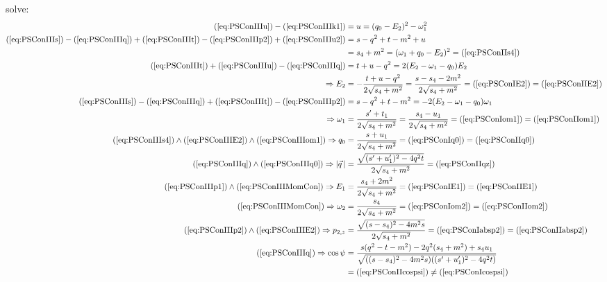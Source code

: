 solve:
\begin{align}
(\ref{eq:PSConIIIu})-(\ref{eq:PSConIIIk1}) &= u=(q_0-E_2)^2-\omega_1^2 \label{eq:PSConIIIu2}\\
(\ref{eq:PSConIIIs}) - (\ref{eq:PSConIIIq}) + (\ref{eq:PSConIIIt}) - (\ref{eq:PSConIIIp2}) + (\ref{eq:PSConIIIu2}) &= s-q^2+t-m^2+u\\
 &= s_4+m^2 = (\omega_1+q_0-E_2)^2 =(\ref{eq:PSConIIs4}) \label{eq:PSConIIIs4}\\
(\ref{eq:PSConIIIt}) + (\ref{eq:PSConIIIu}) - (\ref{eq:PSConIIIq}) &= t+u-q^2 = 2(E_2-\omega_1-q_0)E_2\\
\Rightarrow E_2 &= -\frac{t+u-q^2}{2\sqrt{s_4+m^2}} =\frac{s-s_4-2m^2}{2\sqrt{s_4+m^2}} = (\ref{eq:PSConIE2}) = (\ref{eq:PSConIIE2}) \label{eq:PSConIIIE2}\\
(\ref{eq:PSConIIIs}) - (\ref{eq:PSConIIIq}) + (\ref{eq:PSConIIIt}) - (\ref{eq:PSConIIIp2}) &= s-q^2+t-m^2 = -2(E_2-\omega_1-q_0)\omega_1\\
\Rightarrow \omega_1 &= \frac{s'+t_1}{2\sqrt{s_4+m^2}} =\frac{s_4-u_1}{2\sqrt{s_4+m^2}} = (\ref{eq:PSConIom1}) = (\ref{eq:PSConIIom1})\label{eq:PSConIIIom1}\\
(\ref{eq:PSConIIIs4}) \land (\ref{eq:PSConIIIE2}) \land (\ref{eq:PSConIIIom1}) \Rightarrow q_0 &= \frac{s+u_1}{2\sqrt{s_4+m^2}} = (\ref{eq:PSConIq0}) = (\ref{eq:PSConIIq0}) \label{eq:PSConIIIq0}\\
(\ref{eq:PSConIIIq}) \land (\ref{eq:PSConIIIq0}) \Rightarrow \left|\vec q\,\right| &= \frac{\sqrt{(s'+u_1')^2-4q^2t}}{2\sqrt{s_4+m^2}} =(\ref{eq:PSConIIqz}) \label{eq:PSConIIabsq}\\
(\ref{eq:PSConIIIp1})\land(\ref{eq:PSConIIIMomCon}) \Rightarrow E_1 &= \frac{s_4+2m^2}{2\sqrt{s_4+m^2}} = (\ref{eq:PSConIE1}) = (\ref{eq:PSConIIE1}) \label{eq:PSConIIIE1}\\
(\ref{eq:PSConIIIMomCon}) \Rightarrow \omega_2 &= \frac{s_4}{2\sqrt{s_4+m^2}} = (\ref{eq:PSConIom2}) = (\ref{eq:PSConIIom2}) \label{eq:PSConIIIom2}\\
(\ref{eq:PSConIIIp2}) \land (\ref{eq:PSConIIIE2}) \Rightarrow p_{2,z} &= \frac{\sqrt{(s-s_4)^2-4m^2 s}}{2\sqrt{s_4+m^2}} = (\ref{eq:PSConIabsp2}) = (\ref{eq:PSConIIabsp2}) \label{eq:PSConIIIabsp2}\\
(\ref{eq:PSConIIIq}) \Rightarrow \cos\psi &= \frac{s(q^2-t-m^2)- 2q^2(s_4+m^2)+s_4 u_1}{\sqrt{((s-s_4)^2-4m^2s)((s'+u_1')^2-4q^2 t)}} \label{eq:PSConIIIcospsi}\\
 &=(\ref{eq:PSConIIcospsi}) \neq (\ref{eq:PSConIcospsi}) \nonumber
\end{align}


